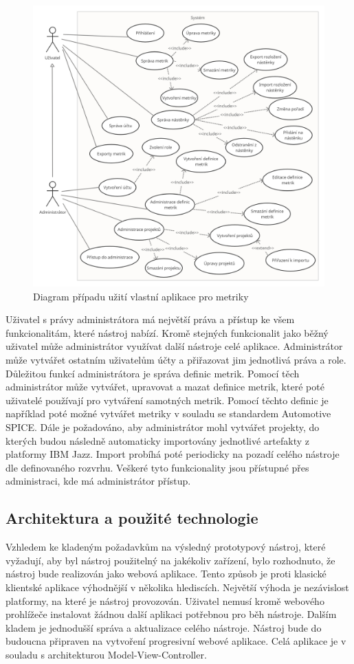 \documentclass[czech,master,public,dept460,male,cpdeclaration,oneside]{diploma}
\begin{document}
\begin{figure}[!ht]
    \centering
    \includegraphics[width=1\textwidth]{Diplomka/Figures/use_case_jazz.png}
    \caption{Diagram případu užití vlastní aplikace pro metriky}
    \label{fig:jazz_metrics_use_case}
\end{figure}
Uživatel s právy administrátora má největší práva a přístup ke všem funkcionalitám, které nástroj nabízí. Kromě stejných funkcionalit jako běžný uživatel může administrátor využívat další nástroje celé aplikace. Administrátor může vytvářet ostatním uživatelům účty a přiřazovat jim jednotlivá práva a role. Důležitou funkcí administrátora je správa definic metrik. Pomocí těch administrátor může vytvářet, upravovat a mazat definice metrik, které poté uživatelé používají pro vytváření samotných metrik. Pomocí těchto definic je například poté možné vytvářet metriky v souladu se standardem Automotive SPICE. Dále je požadováno, aby administrátor mohl vytvářet projekty, do kterých budou následně automaticky importovány jednotlivé artefakty z platformy IBM Jazz. Import probíhá poté periodicky na pozadí celého nástroje dle definovaného rozvrhu. Veškeré tyto funkcionality jsou přístupné přes administraci, kde má administrátor přístup.

\subsection{Architektura a použité technologie}
Vzhledem ke kladeným požadavkům na výsledný prototypový nástroj, které vyžadují, aby byl nástroj použitelný na jakékoliv zařízení, bylo rozhodnuto, že nástroj bude realizován jako webová aplikace. Tento způsob je proti klasické klientské aplikace výhodnější v několika hlediscích. Největší výhoda je nezávislost platformy, na které je nástroj provozován. Uživatel nemusí kromě webového prohlížeče instalovat žádnou další aplikaci potřebnou pro běh nástroje. Dalším kladem je jednodušší správa a aktualizace celého nástroje. Nástroj bude do budoucna připraven na vytvoření progresivní webové aplikace. Celá aplikace je v souladu s architekturou Model-View-Controller.
\end{document}
